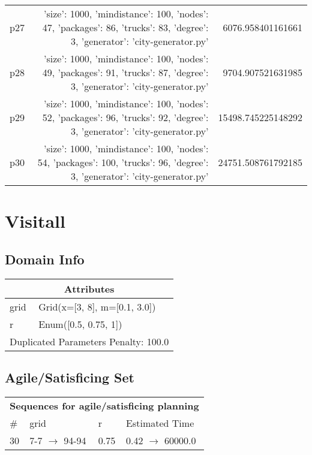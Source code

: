 \documentclass{article}
\begin{document}
\begin{center}
\begin{tabular}{r|r|r}
  p27&{'size': 1000, 'mindistance': 100, 'nodes': 47, 'packages': 86, 'trucks': 83, 'degree': 3, 'generator': 'city-generator.py'}&6076.958401161661\\
  p28&{'size': 1000, 'mindistance': 100, 'nodes': 49, 'packages': 91, 'trucks': 87, 'degree': 3, 'generator': 'city-generator.py'}&9704.907521631985\\
  p29&{'size': 1000, 'mindistance': 100, 'nodes': 52, 'packages': 96, 'trucks': 92, 'degree': 3, 'generator': 'city-generator.py'}&15498.745225148292\\
  p30&{'size': 1000, 'mindistance': 100, 'nodes': 54, 'packages': 100, 'trucks': 96, 'degree': 3, 'generator': 'city-generator.py'}&24751.508761792185
                            \end{tabular}
                            \end{center}
                    
                            \newpage \section{Visitall}
                    \subsection*{Domain Info}

                    \begin{center}
                    \begin{tabular}{p{}p{}}
                    \multicolumn{2}{c}{\bf \large Attributes}\\\midrule
                    grid & Grid(x=[3, 8], m=[0.1, 3.0])\\
r & Enum([0.5, 0.75, 1])
                    
                     \\\midrule
                    \multicolumn{2}{l}{Duplicated Parameters Penalty: 100.0}
                    \end{tabular}
                    \end{center}
                
                         \subsection*{Agile/Satisficing Set}

                        \begin{center}
                        \begin{tabular}{l|l|l|l}
                        \multicolumn{4}{c}{\bf \large Sequences for agile/satisficing planning}\\
                        \# & grid & r & Estimated Time\\\midrule
                        30&7-7 $\rightarrow$ 94-94&0.75&0.42 $\rightarrow$ 60000.0
                        \end{tabular}
                        \end{center}
                    
\end{document}
